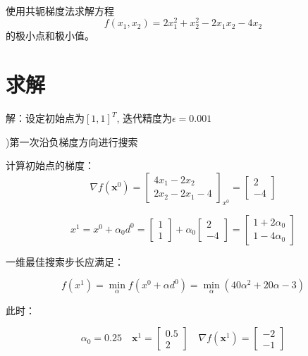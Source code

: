\documentclass[10pt, a4paper,UTF8]{article}
\begin{document}
\paragraph{}
使用共轭梯度法求解方程
\begin{equation}
    f(x_1, x_2) = 2x_{1}^2 + x_{2}^2 - 2x_{1}x_{2} - 4x_{2}
\end{equation}
的极小点和极小值。

\section{求解}
解：设定初始点为$[1, 1]^T$, 迭代精度为$\epsilon=0.001$
\par
{})第一次沿负梯度方向进行搜索
\par
\qquad 计算初始点的梯度：
$$ \nabla f\left(\boldsymbol{x}^{0}\right)=\left[\begin{array}{c}{4 x_{1}-2 x_{2}} \\ {2 x_{2}-2 x_{1} - 4}\end{array}\right]_{x^{0}}=\left[\begin{array}{c}{2} \\ {-4}\end{array}\right] $$

$$ x^{1}=x^{0}+\alpha_{0} d^{0}=\left[\begin{array}{l}{1} \\ {1}\end{array}\right]+\alpha_{0}\left[\begin{array}{c}{2} \\ {-4}\end{array}\right]=\left[\begin{array}{c}{1+2 \alpha_{0}} \\ {1-4 \alpha_{0}}\end{array}\right] $$

\qquad 一维最佳搜索步长应满足：

$$ f\left(x^{1}\right)=\min _{\alpha} f\left(x^{0}+\alpha d^{0}\right)=\min _{\alpha}\left(40 \alpha^{2}+20 \alpha-3\right)  $$

\par
\qquad 此时：

$$ \alpha_{0}=0.25 \quad \boldsymbol{x}^{1}=\left[\begin{array}{c}{0.5} \\ {2}\end{array}\right] \quad \nabla f\left(\boldsymbol{x}^{1}\right)=\left[\begin{array}{c}{-2} \\ {-1}\end{array}\right] $$
\end{document}
